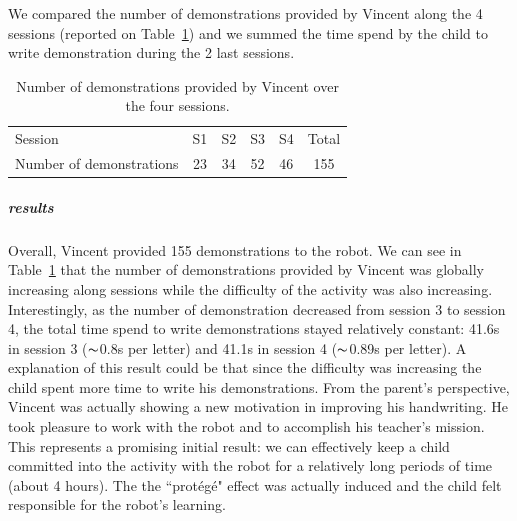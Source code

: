 \documentclass[10pt,a4paper]{article}
\begin{document}
We compared the number of demonstrations provided by Vincent along the 4 sessions (reported on Table~\ref{table:vincent_sess}) and we summed the time spend by the child to write demonstration during the 2 last sessions.
\begin{table}[!]
    \centering
    \caption{\footnotesize Number of demonstrations provided by Vincent over the four sessions.}
    \begin{tabular}{lccccc}
        \toprule
        Session & S1 & S2 & S3 & S4 & Total\\ 
        Number of demonstrations & 23 & 34 & 52 & 46 & 155\\ 
        \bottomrule

    \end{tabular}
    \label{table:vincent_sess}
\end{table}
\subparagraph{results}
Overall, Vincent provided 155 demonstrations to the robot. We can see in Table~\ref{table:vincent_sess} that the number of demonstrations provided by Vincent was globally increasing along sessions while the difficulty of the activity was also increasing. Interestingly, as the number of demonstration decreased from session 3 to session 4, the total time spend to write demonstrations stayed relatively constant: 41.6s in session 3 ($\thicksim$0.8s per letter) and 41.1s in session 4 ($\thicksim$0.89s per letter). A explanation of this result could be that since the difficulty was increasing the child spent more time to write his demonstrations. From the parent's perspective, Vincent was actually showing a new motivation in improving his handwriting. He took pleasure to work with the robot and to accomplish his teacher's mission. This represents a promising initial
result: we can effectively keep a child committed into the activity with the robot for a relatively long periods of time (about 4 hours).
The the ``prot\'eg\'e" effect was actually induced and the child felt responsible for the robot's learning.
\end{document}
